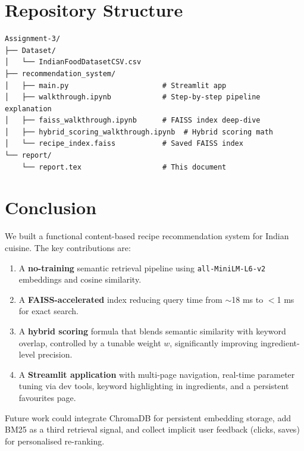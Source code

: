 \documentclass[12pt,a4paper]{article}
\begin{document}
\section{Repository Structure}

\begin{verbatim}
Assignment-3/
├── Dataset/
│   └── IndianFoodDatasetCSV.csv
├── recommendation_system/
│   ├── main.py                      # Streamlit app
│   ├── walkthrough.ipynb            # Step-by-step pipeline explanation
│   ├── faiss_walkthrough.ipynb      # FAISS index deep-dive
│   ├── hybrid_scoring_walkthrough.ipynb  # Hybrid scoring math
│   └── recipe_index.faiss           # Saved FAISS index
└── report/
    └── report.tex                   # This document
\end{verbatim}

\section{Conclusion}

We built a functional content-based recipe recommendation system for Indian
cuisine. The key contributions are:

\begin{enumerate}
  \item A \textbf{no-training} semantic retrieval pipeline using
        \texttt{all-MiniLM-L6-v2} embeddings and cosine similarity.
  \item A \textbf{FAISS-accelerated} index reducing query time from $\sim$18 ms
        to $<$1 ms for exact search.
  \item A \textbf{hybrid scoring} formula that blends semantic similarity with
        keyword overlap, controlled by a tunable weight $w$, significantly
        improving ingredient-level precision.
  \item A \textbf{Streamlit application} with multi-page navigation,
        real-time parameter tuning via dev tools, keyword highlighting in
        ingredients, and a persistent favourites page.
\end{enumerate}

Future work could integrate ChromaDB for persistent embedding storage,
add BM25 as a third retrieval signal, and collect implicit user feedback
(clicks, saves) for personalised re-ranking.
\end{document}
